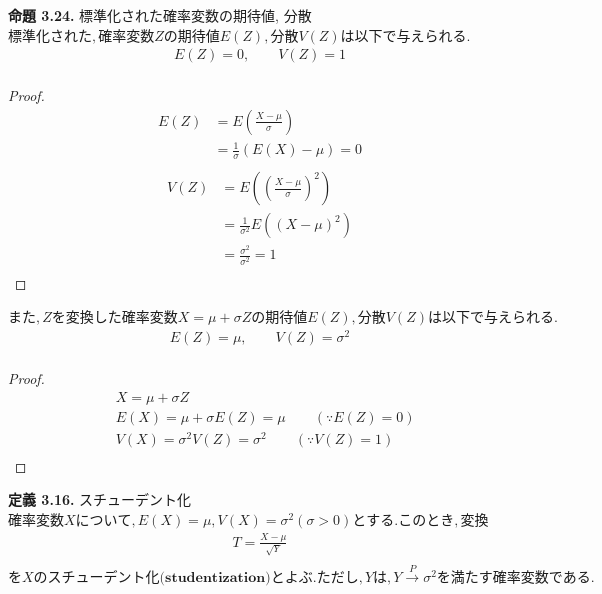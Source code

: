 \documentclass[dvipdfmx,10pt, a4j]{jarticle}
\theoremstyle{definition}
\begin{document}
\noindent
\textbf{命題 3.24.} 標準化された確率変数の期待値, 分散\\
$標準化された, 確率変数Z の期待値 E(Z), 分散 V(Z) は以下で与えられる.$\\
\begin{align*}
    E(Z) = 0, \qquad V(Z) = 1 \\
\end{align*}
\begin{proof}
    \begin{align*}
        E(Z) & = E \left(\frac{X - \mu}{\sigma}\right) \\
             & = \frac{1}{\sigma}(E(X) - \mu) = 0      \\
    \end{align*}
    \begin{align*}
        V(Z) & = E \left(\left(\frac{X - \mu}{\sigma}\right)^2 \right) \\
             & = \frac{1}{\sigma^2}E((X - \mu)^2)                      \\
             & = \frac{\sigma^2}{\sigma^2} = 1                         \\
    \end{align*}
\end{proof}
$また, Zを変換した確率変数 X = \mu + \sigma Z の期待値 E(Z), 分散 V(Z) は以下で与えられる.$\\
\begin{align*}
    E(Z) = \mu, \qquad V(Z) = \sigma^2 \\
\end{align*}
\begin{proof}
    \begin{align*}
         & X = \mu + \sigma Z                                         \\
         & E(X) = \mu + \sigma E(Z) = \mu \qquad (\because E(Z) = 0)  \\
         & V(X) = \sigma^2 V(Z) = \sigma^2 \qquad (\because V(Z) = 1) \\
    \end{align*}
\end{proof}

\newpage
\noindent
\textbf{定義 3.16.} スチューデント化\\
$確率変数Xについて, E(X) = \mu, V(X)=\sigma^2 (\sigma > 0) とする.このとき, 変換$\\
\begin{align*}
    T =\frac{X-\mu}{\sqrt{Y}} \\
\end{align*}
$をXの \textbf{スチューデント化(studentization)}とよぶ. ただし, Yは, Y \xrightarrow{P} \sigma^2 を満たす確率変数である.$\\
\end{document}
